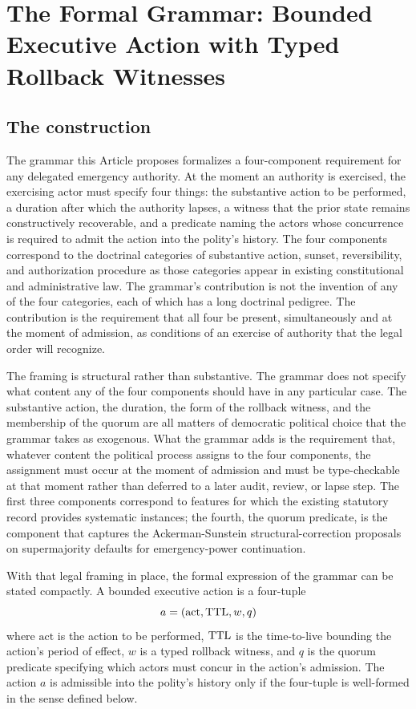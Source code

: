 \section{The Formal Grammar: Bounded Executive Action with Typed Rollback Witnesses}
\label{sec:grammar}

\subsection{The construction}

The grammar this Article proposes formalizes a four-component requirement for any delegated emergency authority.
At the moment an authority is exercised, the exercising actor must specify four things:
the substantive action to be performed,
a duration after which the authority lapses,
a witness that the prior state remains constructively recoverable,
and a predicate naming the actors whose concurrence is required to admit the action into the polity's history.
The four components correspond to the doctrinal categories of substantive action, sunset, reversibility,
and authorization procedure as those categories appear in existing constitutional and administrative law.
The grammar's contribution is not the invention of any of the four categories,
each of which has a long doctrinal pedigree.
The contribution is the requirement that all four be present, simultaneously and at the moment of admission,
as conditions of an exercise of authority that the legal order will recognize.

The framing is structural rather than substantive.
The grammar does not specify what content any of the four components should have in any particular case.
The substantive action, the duration, the form of the rollback witness, and the membership of the quorum
are all matters of democratic political choice that the grammar takes as exogenous.
What the grammar adds is the requirement that, whatever content the political process assigns to the four
components, the assignment must occur at the moment of admission and must be type-checkable at that moment
rather than deferred to a later audit, review, or lapse step.
The first three components correspond to features for which the existing statutory record provides
systematic instances; the fourth, the quorum predicate, is the component that captures the
Ackerman-Sunstein structural-correction proposals on supermajority defaults for emergency-power continuation.

With that legal framing in place, the formal expression of the grammar can be stated compactly.
A bounded executive action is a four-tuple
\[
a = (\text{act}, \mathrm{TTL}, w, q)
\]
where $\text{act}$ is the action to be performed, $\mathrm{TTL}$ is the time-to-live bounding the action's
period of effect, $w$ is a typed rollback witness, and $q$ is the quorum predicate specifying which actors
must concur in the action's admission.
The action $a$ is admissible into the polity's history only if the four-tuple is well-formed in the sense
defined below.

